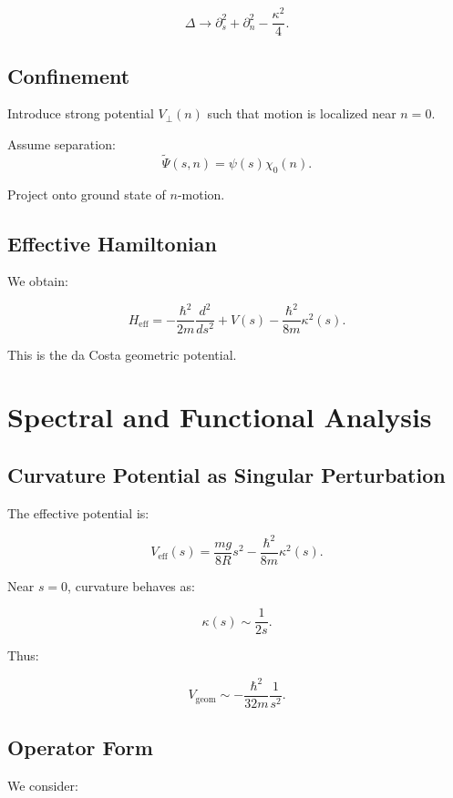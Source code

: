 \documentclass[11pt]{article}
\begin{document}
\begin{equation}
\Delta \rightarrow
\partial_s^2 + \partial_n^2 - \frac{\kappa^2}{4}.
\end{equation}

\subsection{Confinement}

Introduce strong potential $V_\perp(n)$ such that motion is localized near $n=0$.

Assume separation:
\[
\tilde{\Psi}(s,n) = \psi(s)\chi_0(n).
\]

Project onto ground state of $n$-motion.

\subsection{Effective Hamiltonian}

We obtain:

\begin{equation}
H_{\mathrm{eff}} =
-\frac{\hbar^2}{2m}\frac{d^2}{ds^2}
+ V(s)
-\frac{\hbar^2}{8m}\kappa^2(s).
\end{equation}

This is the da Costa geometric potential.


\section{Spectral and Functional Analysis}

\subsection{Curvature Potential as Singular Perturbation}

The effective potential is:

\[
V_{\mathrm{eff}}(s) =
\frac{mg}{8R}s^2 - \frac{\hbar^2}{8m}\kappa^2(s).
\]

Near $s=0$, curvature behaves as:

\[
\kappa(s) \sim \frac{1}{2s}.
\]

Thus:

\[
V_{\mathrm{geom}} \sim -\frac{\hbar^2}{32m}\frac{1}{s^2}.
\]

\subsection{Operator Form}

We consider:
\end{document}

